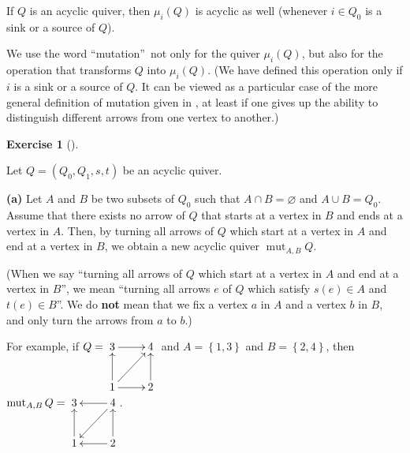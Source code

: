 \documentclass[numbers=enddot,12pt,final,onecolumn,notitlepage]{scrartcl}%
\newcounter{exer}
\numberwithin{exer}{section}
\theoremstyle{definition}
\newtheorem{exmp}[exer]{Exercise}
\newenvironment{exercise}[1][]
{\begin{exmp}[#1]\begin{leftbar}}
{\end{leftbar}\end{exmp}}
\begin{document}
\begin{itemize}
If $Q$ is an acyclic quiver, then $\mu_{i}\left(  Q\right)  $ is acyclic as
well (whenever $i\in Q_{0}$ is a sink or a source of $Q$).

We use the word \textquotedblleft mutation\textquotedblright\ not only for the
quiver $\mu_{i}\left(  Q\right)  $, but also for the operation that transforms
$Q$ into $\mu_{i}\left(  Q\right)  $. (We have defined this operation only if
$i$ is a sink or a source of $Q$. It can be viewed as a particular case of the
more general definition of mutation given in \cite[Definition 2.2.1]{Lampe},
at least if one gives up the ability to distinguish different arrows from one
vertex to another.)
\end{itemize}


\begin{exercise}
\label{exe.ps1.1.1}Let $Q=\left(  Q_{0},Q_{1},s,t\right)  $ be an acyclic quiver.

\textbf{(a)} Let $A$ and $B$ be two subsets of $Q_{0}$ such that $A\cap
B=\varnothing$ and $A\cup B=Q_{0}$. Assume that there exists no arrow of $Q$
that starts at a vertex in $B$ and ends at a vertex in $A$. Then, by turning
all arrows of $Q$ which start at a vertex in $A$ and end at a vertex in $B$,
we obtain a new acyclic quiver $\operatorname*{mut}\nolimits_{A,B}Q$.

(When we say \textquotedblleft turning all arrows of $Q$ which start at a
vertex in $A$ and end at a vertex in $B$\textquotedblright, we mean
\textquotedblleft turning all arrows $e$ of $Q$ which satisfy $s\left(
e\right)  \in A$ and $t\left(  e\right)  \in B$\textquotedblright. We do
\textbf{not} mean that we fix a vertex $a$ in $A$ and a vertex $b$ in $B$, and
only turn the arrows from $a$ to $b$.)

For example, if $Q=%
\xymatrix{
3 \ar[r] & 4 \\
1 \ar[u] \ar[ru] \ar[r] & 2 \ar[u]
}%
$ and $A=\left\{  1,3\right\}  $ and $B=\left\{  2,4\right\}  $, then
\newline$\operatorname*{mut}\nolimits_{A,B}Q=%
\xymatrix{
3 & 4 \ar[l] \ar[ld] \\
1 \ar[u] & 2 \ar[u] \ar[l]
}%
$.


\end{exercise}
\end{document}
